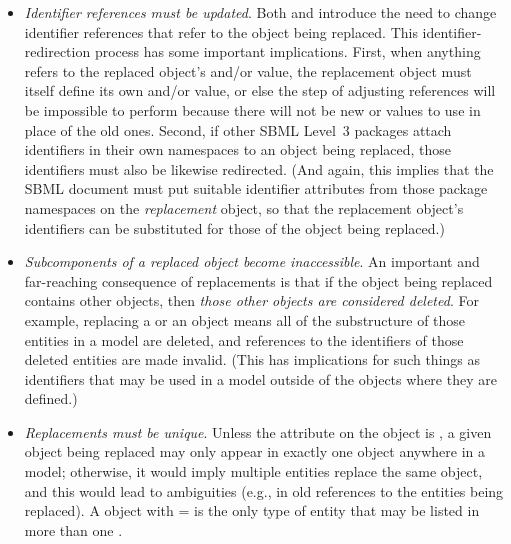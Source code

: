 \begin{itemize}

\item \emph{Identifier references must be updated}.  Both
  \ReplacedElement and \ReplacedBy introduce the need to change
  identifier references that refer to the object being replaced.  This
  identifier-redirection process has some important implications.
  First, when anything refers to the replaced object's  and/or
   value, the replacement object must itself define its
  own  and/or  value, or else the step of
  adjusting references will be impossible to perform because there will
  not be new  or  values to use in place of the
  old ones.  Second, if other SBML Level~3 packages attach identifiers
  in their own namespaces to an object being replaced, those identifiers
  must also be likewise redirected.  (And again, this implies that the
  SBML document must put suitable identifier attributes from those
  package namespaces on the \emph{replacement} object, so that the
  replacement object's identifiers can be substituted for those of the
  object being replaced.)

\item \emph{Subcomponents of a replaced object become inaccessible}.  An
  important and far-reaching consequence of replacements is that if the
  object being replaced contains other objects, then \emph{those other
    objects are considered deleted}.  For example, replacing a \Reaction
  or an \Event object means all of the substructure of those entities in
  a model are deleted, and references to the identifiers of those
  deleted entities are made invalid.  (This has implications for such
  things as \SpeciesReference identifiers that may be used in a model
  outside of the \Reaction objects where they are defined.)

\item \emph{Replacements must be unique}.  Unless the 
  attribute on the \ReplacedElement object is , a given object
  being replaced may only appear in exactly one \ReplacedElement object
  anywhere in a model; otherwise, it would imply multiple entities
  replace the same object, and this would lead to ambiguities (e.g., in
  old references to the entities being replaced).  A \ReplacedElement
  object with = is the only type of entity
  that may be listed in more than one \ListOfReplacedElements.

\end{itemize}

